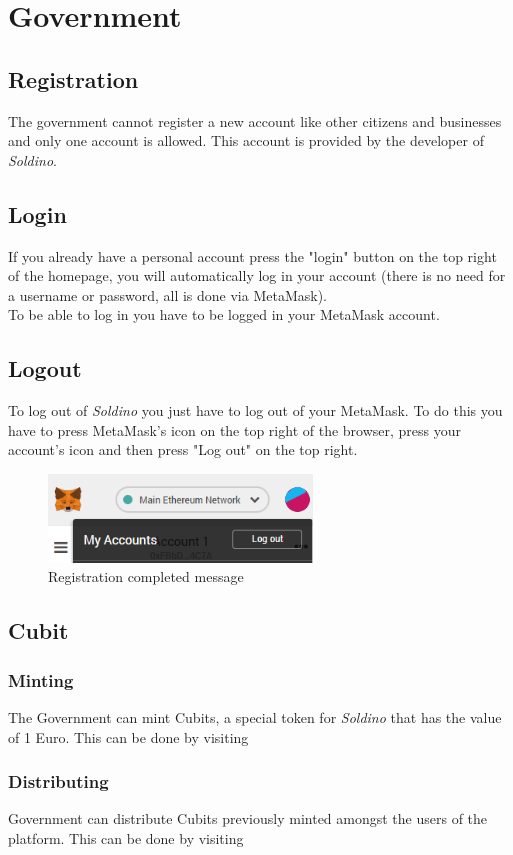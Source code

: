 \section{Government}
	\subsection{Registration}
	The government cannot register a new account like other citizens and 
	businesses and only one account is allowed. This account is provided 
	by the developer of \textit{Soldino}.
	\subsection{Login}
	If you already have a personal account press the "login" button on the 
	top right of the homepage, you will automatically log in your account 
	(there is no need for a username or password, all is done via MetaMask). 
	\\To be able to log in you have to be logged in your MetaMask account.
	\subsection{Logout}
	To log out of \textit{Soldino} you just have to log out of 
	your MetaMask. To do this you have to press MetaMask's icon on the top 
	right of the browser, press your account's icon and then press "Log out"
	on the top right.
	\begin{figure}[H]
		\includegraphics[width=7cm]{res/images/logout_metamask.png}
		\centering
		\caption{Registration completed message}
	\end{figure}
	\subsection{Cubit}
		\subsubsection{Minting}
		The Government can mint Cubits, a special token for \textit{Soldino} 
		that has the value of 1 Euro. This can be done by visiting 
		
		\subsubsection{Distributing}
		Government can distribute Cubits previously minted amongst the users of 
		the platform. This can be done by visiting 
		
